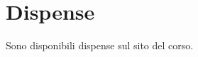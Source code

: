 \documentclass[\main/main.tex]{subfiles}
\begin{document}
\section{Dispense}
Sono disponibili dispense sul sito del corso.
\end{document}

